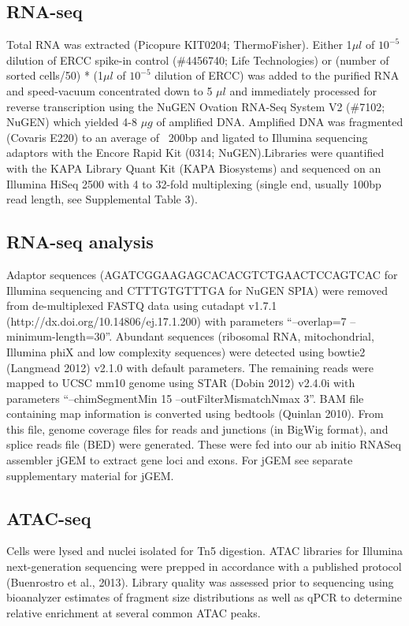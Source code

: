 \subsection{RNA-seq}
Total RNA was extracted (Picopure KIT0204; ThermoFisher). Either 1$\mu l$ of $10^{-5}$ dilution of ERCC spike-in control (\#4456740; Life Technologies) or (number of sorted cells/50) * (1$\mu l$ of $10^{-5}$ dilution of ERCC) was added to the purified RNA and speed-vacuum concentrated down to 5 $\mu l$ and immediately processed for reverse transcription using the NuGEN Ovation RNA-Seq System V2 (\#7102; NuGEN) which yielded 4-8 $\mu g$ of amplified DNA. Amplified DNA was fragmented (Covaris E220) to an average of ~200bp and ligated to Illumina sequencing adaptors with the Encore Rapid Kit (0314; NuGEN).Libraries were quantified with the KAPA Library Quant Kit (KAPA Biosystems) and sequenced on an Illumina HiSeq 2500 with 4 to 32-fold multiplexing (single end, usually 100bp read length, see Supplemental Table 3).

\subsection{RNA-seq analysis}
Adaptor sequences (AGATCGGAAGAGCACACGTCTGAACTCCAGTCAC for Illumina sequencing and CTTTGTGTTTGA for NuGEN SPIA) were removed from de-multiplexed FASTQ data using cutadapt v1.7.1 (http://dx.doi.org/10.14806/ej.17.1.200) with parameters “--overlap=7 --minimum-length=30”. Abundant sequences (ribosomal RNA, mitochondrial, Illumina phiX and low complexity sequences) were detected using bowtie2 (Langmead 2012) v2.1.0 with default parameters. The remaining reads were mapped to UCSC mm10 genome using STAR (Dobin 2012) v2.4.0i with parameters “--chimSegmentMin 15 --outFilterMismatchNmax 3”. BAM file containing map information is converted using bedtools (Quinlan 2010). From this file, genome coverage files for reads and junctions (in BigWig format), and splice reads file (BED) were generated. These were fed into our ab initio RNASeq assembler jGEM to extract gene loci and exons. For jGEM see separate supplementary material for jGEM.

\subsection{ATAC-seq}
Cells were lysed and nuclei isolated for Tn5 digestion. ATAC libraries for Illumina next-generation sequencing were prepped in accordance with a published protocol (Buenrostro et al., 2013). Library quality was assessed prior to sequencing using bioanalyzer estimates of fragment size distributions as well as qPCR to determine relative enrichment at several common ATAC peaks.

